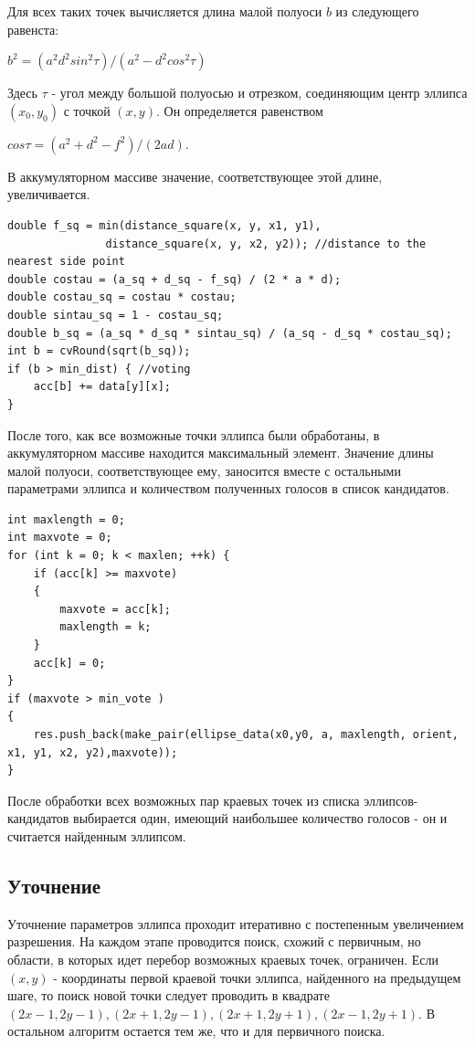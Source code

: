 Для всех таких точек вычисляется длина малой полуоси \(b\) из следующего равенста:

\(b^2 = (a^2d^2sin^2\tau)/(a^2-d^2cos^2\tau) \)

Здесь \(\tau\) - угол между большой полуосью и отрезком, соединяющим центр эллипса \((x_0, y_0)\) с точкой \((x, y)\). Он определяется равенством

\(cos\tau = (a^2 + d^2 - f^2)/(2ad)\).

В аккумуляторном массиве значение, соответствующее этой длине, увеличивается.
\begin{lstlisting}
double f_sq = min(distance_square(x, y, x1, y1),
               distance_square(x, y, x2, y2)); //distance to the nearest side point
double costau = (a_sq + d_sq - f_sq) / (2 * a * d);
double costau_sq = costau * costau;
double sintau_sq = 1 - costau_sq;
double b_sq = (a_sq * d_sq * sintau_sq) / (a_sq - d_sq * costau_sq);
int b = cvRound(sqrt(b_sq));
if (b > min_dist) { //voting
    acc[b] += data[y][x];
}
\end{lstlisting}

После того, как все возможные точки эллипса были обработаны, в аккумуляторном массиве находится максимальный элемент. 
Значение длины малой полуоси, соответствующее ему, заносится вместе с остальными параметрами эллипса и количеством полученных голосов в список кандидатов.
\begin{lstlisting}
int maxlength = 0;
int maxvote = 0;
for (int k = 0; k < maxlen; ++k) {
    if (acc[k] >= maxvote)
    {
        maxvote = acc[k];
        maxlength = k;
    }
    acc[k] = 0;
}
if (maxvote > min_vote )
{
    res.push_back(make_pair(ellipse_data(x0,y0, a, maxlength, orient, x1, y1, x2, y2),maxvote));
}
\end{lstlisting}

После обработки всех возможных пар краевых точек из списка эллипсов-кандидатов выбирается один, имеющий наибольшее количество голосов - он и считается найденным эллипсом.

\subsection{Уточнение}
Уточнение параметров эллипса проходит итеративно с постепенным увеличением разрешения.
На каждом этапе проводится поиск, схожий с первичным, но области, в которых идет перебор возможных краевых точек, ограничен.
Если \((x, y)\) - координаты первой краевой точки эллипса, найденного на предыдущем шаге, то поиск новой точки следует 
проводить в квадрате \((2x - 1, 2y - 1), (2x + 1, 2y - 1), (2x + 1, 2y + 1), (2x - 1, 2y + 1)\). В остальном алгоритм остается тем же, что и для первичного поиска.

